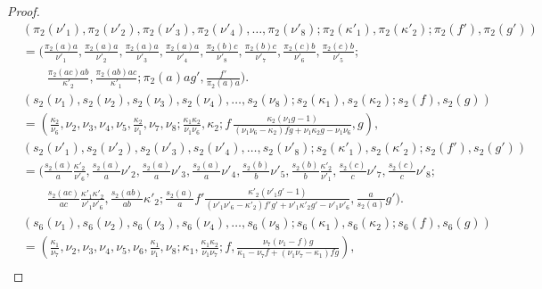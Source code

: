 \documentclass[12pt]{amsart}
\numberwithin{equation}{section}
\theoremstyle{definition}
\begin{document}
\begin{proof}
\begin{align}
& (\pi _2 ( \nu '_1) , \pi _2 (\nu '_2) , \pi _2 ( \nu '_3) , \pi _2 ( \nu '_4) , \dots , \pi _2 (\nu '_8) ;  \pi _2 (\kappa '_1) , \pi _2 (\kappa '_2) ;  \pi _2 (f' ) , \pi _2 (g') ) \nonumber \\
& =  (\frac{\pi _2 ( a ) a }{\nu ' _1}, \frac{\pi _2 ( a ) a }{\nu  '_2}, \frac{\pi _2 ( a ) a }{\nu  '_3}, \frac{\pi _2 ( a ) a }{\nu  '_4}, \frac{\pi _2 ( b ) c }{\nu  '_8} , \frac{\pi _2 ( b ) c }{\nu  '_7}, \frac{\pi _2 ( c ) b }{\nu  '_6}, \frac{\pi _2 ( c ) b }{\nu  '_5} ; \nonumber \\
& \qquad   \frac{\pi _2 ( a c ) a b }{\kappa  '_2} , \frac{\pi _2 ( a b ) a c }{\kappa  '_1 } ; \pi _2 ( a ) a g ' ,  \frac{f ' }{\pi _2 ( a ) a}) . \nonumber
\end{align} 
\begin{align}
& (s _2 ( \nu _1) , s _2 (\nu _2) , s _2 ( \nu _3) , s _2 ( \nu _4) , \dots , s _2 (\nu _8) ;  s _2 (\kappa _1) , s _2 (\kappa _2) ;  s _2 (f ) , s _2 (g) ) \\
& =  (\frac{\kappa_2 }{\nu_6 }, \nu_2 , \nu_3 , \nu_4 ,\nu_5 ,\frac{\kappa_2 }{\nu_1} , \nu_7 ,\nu_8 ; \frac{\kappa_1 \kappa_2 }{\nu_1 \nu_6} ,\kappa_2 ;  f\, \frac{\kappa_2 ( \nu_1 g-1)  }{ (\nu _1 \nu_6 - \kappa_2  )fg + \nu _1 \kappa_2 g - \nu _1 \nu_6 } ,g ) , \nonumber \\
& (s _2 ( \nu '_1) , s _2 (\nu '_2) , s _2 ( \nu '_3) , s _2 ( \nu '_4) , \dots , s _2 (\nu '_8) ;  s _2 (\kappa '_1) , s _2 (\kappa '_2) ; s _2 (f' ) , s _2 (g') ) \nonumber \\
& =  (\frac{s _2 (a)}{a} \frac{\kappa '_2 }{\nu '_6} , \frac{s _2 (a)}{a} \nu '_2 , \frac{s _2 (a)}{a} \nu '_3 , \frac{s _2 (a)}{a} \nu '_4 , \frac{s _2 (b)}{b} \nu '_5 , \frac{s _2 (b)}{b} \frac{\kappa '_2 }{\nu '_1} , \frac{s _2 (c)}{c} \nu '_7 , \frac{s _2 (c)}{c} \nu '_8 ; \nonumber \\
& \qquad \frac{s _2 (ac)}{ac} \frac{\kappa '_1 \kappa '_2 }{\nu '_1 \nu '_6} , \frac{s _2 (ab)}{ab} \kappa '_2 ; \frac{s _2 (a)}{a} f' \frac{\kappa '_2 ( \nu '_1 g' -1)}{(\nu ' _1 \nu '_6 - \kappa '_2  ) f' g' + \nu ' _1 \kappa '_2 g' - \nu ' _1 \nu '_6 } , \frac{a}{s _2 (a)} g' ) . \nonumber 
\end{align} 
\begin{align}
& (s _6 ( \nu _1) , s _6 (\nu _2) , s _6 ( \nu _3) , s _6 ( \nu _4) , \dots , s _6 (\nu _8) ;  s _6 (\kappa _1) , s _6 (\kappa _2) ;  s _6 (f ) , s _6 (g) ) \\
& =  (\frac{\kappa_1 }{\nu_7} , \nu_2 , \nu_3 , \nu_4 ,\nu_5 ,\nu_6 , \frac{\kappa_1 }{\nu_1} ,\nu_8 ; \kappa_1, \frac{\kappa_1 \kappa_2 }{\nu_1 \nu _7 } ;  f, \frac{\nu _7 ( \nu_1 - f ) g }{ \kappa_1  -  \nu _7 f + ( \nu _1 \nu_7 - \kappa_1 )fg } ) , \nonumber \\

\end{align}
\end{proof}
\end{document}
